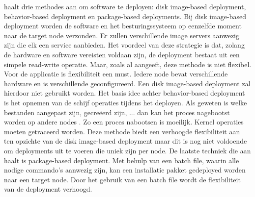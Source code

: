 \citet{deploymentMethods} haalt drie methodes aan om software te deployen: disk image-based deployment, behavior-based deployment en package-based deployments.
Bij disk image-based deployment worden de software en het besturingssysteem op eenzelfde moment naar de target node verzonden.
Er zullen verschillende image servers aanwezig zijn die elk een service aanbieden.
Het voordeel van deze strategie is dat, zolang de hardware en software vereisten voldaan zijn, de deployment bestaat uit een simpele read-write operatie.
Maar, zoals \citet{deploymentMethods} al aangeeft, deze methode is niet flexibel.
Voor de applicatie is flexibiliteit een must.
Iedere node bevat verschillende hardware en is verschillende geconfigureerd.
Een disk image-based deployment zal hierdoor niet gebruikt worden.
Het basis idee achter behavior-based deployment is het opnemen van de schijf operaties tijdens het deployen.
Als geweten is welke bestanden aangepast zijn, gecreëerd zijn, ... dan kan het proces nagebootst worden op andere nodes \citep{deploymentMethods}.
Zo een proces nabootsen is moeilijk.
Kernel operaties moeten getraceerd worden.
Deze methode biedt een verhoogde flexibiliteit aan ten opzichte van de disk image-based deployment maar dit is nog niet voldoende om deployments uit te voeren die uniek zijn per node.
De laatste techniek die \citet{deploymentMethods} aan haalt is package-based deployment.
Met behulp van een batch file, waarin alle nodige commando's aanwezig zijn, kan een installatie pakket gedeployed worden naar een target node.
Door het gebruik van een batch file wordt de flexibiliteit van de deployment verhoogd.

